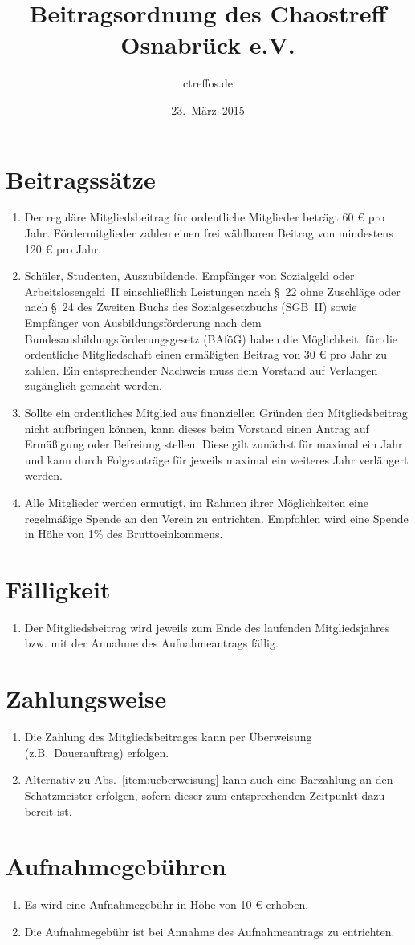 \documentclass[a4paper,12pt]{scrartcl}
\title{Beitragsordnung des Chaostreff Osnabrück e.V.}
\author{ctreffos.de}
\date{23.~März~2015}
\begin{document}
\maketitle

\section{Beitragssätze}
\begin{enumerate}
\item
Der reguläre Mitgliedsbeitrag für ordentliche Mitglieder beträgt 60 €
pro Jahr. Fördermitglieder zahlen einen frei wählbaren Beitrag von
mindestens 120 € pro Jahr.
\item
Schüler, Studenten, Auszubildende, Empfänger von Sozialgeld oder
Arbeitslosengeld~II einschließlich Leistungen nach §~22 ohne Zuschläge
oder nach §~24 des Zweiten Buchs des Sozialgesetzbuchs (SGB~II) sowie
Empfänger von Ausbildungsförderung nach dem
Bundesausbildungsförderungsgesetz (BAföG) haben die Möglichkeit, für
die ordentliche Mitgliedschaft einen ermäßigten Beitrag von 30 € pro
Jahr zu zahlen. Ein entsprechender Nachweis muss dem Vorstand auf
Verlangen zugänglich gemacht werden.
\item
Sollte ein ordentliches Mitglied aus finanziellen Gründen den
Mitgliedsbeitrag nicht aufbringen können, kann dieses beim Vorstand
einen Antrag auf Ermäßigung oder Befreiung stellen. Diese gilt
zunächst für maximal ein Jahr und kann durch Folgeanträge für jeweils
maximal ein weiteres Jahr verlängert werden.
\item
Alle Mitglieder werden ermutigt, im Rahmen ihrer Möglichkeiten eine
regelmäßige Spende an den Verein zu entrichten. Empfohlen wird eine
Spende in Höhe von 1\% des Bruttoeinkommens.
\end{enumerate}

\section{Fälligkeit}
\begin{enumerate}
\item
Der Mitgliedsbeitrag wird jeweils zum Ende des laufenden
Mitgliedsjahres bzw. mit der Annahme des Aufnahmeantrags fällig.
\end{enumerate}

\section{Zahlungsweise}
\begin{enumerate}
\item\label{item:ueberweisung}
Die Zahlung des Mitgliedsbeitrages kann per Überweisung (z.B.\
Dauerauftrag) erfolgen.
\item
Alternativ zu Abs.~\ref{item:ueberweisung} kann auch eine Barzahlung
an den Schatzmeister erfolgen, sofern dieser zum entsprechenden
Zeitpunkt dazu bereit ist.
\end{enumerate}

\section{Aufnahmegebühren}
\begin{enumerate}
\item
Es wird eine Aufnahmegebühr in Höhe von 10 € erhoben.
\item
Die Aufnahmegebühr ist bei Annahme des Aufnahmeantrags zu entrichten.
\end{enumerate}
\end{document}
